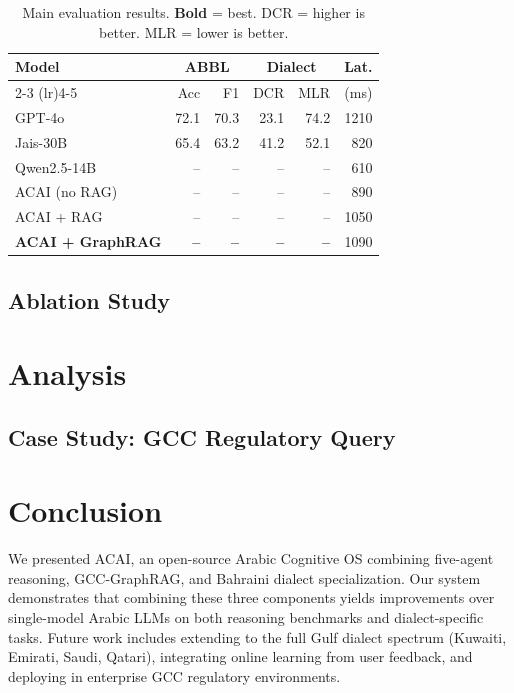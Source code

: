 \documentclass[11pt]{article}
\begin{document}
\begin{table}[h]
\centering
\small
\begin{tabular}{lrrrrr}
\toprule
\multirow{2}{*}{Model} & \multicolumn{2}{c}{ABBL} & \multicolumn{2}{c}{Dialect} & Lat. \\
\cmidrule(lr){2-3} \cmidrule(lr){4-5}
 & Acc & F1 & DCR & MLR & (ms) \\
\midrule
GPT-4o & 72.1 & 70.3 & 23.1 & 74.2 & 1210 \\
Jais-30B & 65.4 & 63.2 & 41.2 & 52.1 & 820 \\
Qwen2.5-14B & -- & -- & -- & -- & 610 \\
ACAI (no RAG) & -- & -- & -- & -- & 890 \\
ACAI + RAG & -- & -- & -- & -- & 1050 \\
\textbf{ACAI + GraphRAG} & \textbf{--} & \textbf{--} & \textbf{--} & \textbf{--} & 1090 \\
\bottomrule
\end{tabular}
\caption{Main evaluation results. \textbf{Bold} = best. DCR = higher is better. MLR = lower is better.}
\label{tab:main}
\end{table}

\subsection{Ablation Study}

\section{Analysis}

\subsection{Case Study: GCC Regulatory Query}

\section{Conclusion}

We presented ACAI, an open-source Arabic Cognitive OS combining
five-agent reasoning, GCC-GraphRAG, and Bahraini dialect specialization.
Our system demonstrates that combining these three components yields
improvements over single-model Arabic LLMs on both reasoning benchmarks
and dialect-specific tasks.
Future work includes extending to the full Gulf dialect spectrum
(Kuwaiti, Emirati, Saudi, Qatari), integrating online learning from
user feedback, and deploying in enterprise GCC regulatory environments.
\end{document}

